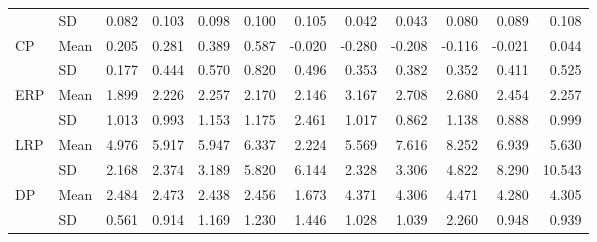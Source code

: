 \begin{longtable}{llrrrrrrrrrr}
   & SD &      0.082 &      0.103 &      0.098 &      0.100 &      0.105 &      0.042 &      0.043 &      0.080 &      0.089 &      0.108 \\
\cline{1-12}
\multirow{2}{*}{CP} & Mean &      0.205 &      0.281 &      0.389 &      0.587 &     -0.020 &     -0.280 &     -0.208 &     -0.116 &     -0.021 &      0.044 \\
   & SD &      0.177 &      0.444 &      0.570 &      0.820 &      0.496 &      0.353 &      0.382 &      0.352 &      0.411 &      0.525 \\
\cline{1-12}
\multirow{2}{*}{ERP} & Mean &      1.899 &      2.226 &      2.257 &      2.170 &      2.146 &      3.167 &      2.708 &      2.680 &      2.454 &      2.257 \\
   & SD &      1.013 &      0.993 &      1.153 &      1.175 &      2.461 &      1.017 &      0.862 &      1.138 &      0.888 &      0.999 \\
\cline{1-12}
\multirow{2}{*}{LRP} & Mean &      4.976 &      5.917 &      5.947 &      6.337 &      2.224 &      5.569 &      7.616 &      8.252 &      6.939 &      5.630 \\
   & SD &      2.168 &      2.374 &      3.189 &      5.820 &      6.144 &      2.328 &      3.306 &      4.822 &      8.290 &     10.543 \\
\cline{1-12}
\multirow{2}{*}{DP} & Mean &      2.484 &      2.473 &      2.438 &      2.456 &      1.673 &      4.371 &      4.306 &      4.471 &      4.280 &      4.305 \\
   & SD &      0.561 &      0.914 &      1.169 &      1.230 &      1.446 &      1.028 &      1.039 &      2.260 &      0.948 &      0.939 \\
\end{longtable}

